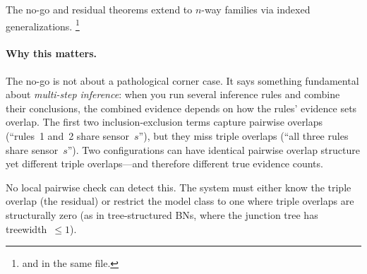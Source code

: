 \documentclass[11pt,openany]{report}
\begin{document}
\noindent
The no-go and residual theorems extend to $n$-way families via
indexed generalizations.%
\footnote{
and  in the same file.}

\paragraph{Why this matters.}
The no-go is not about a pathological corner case.  It says
something fundamental about \emph{multi-step inference}: when you
run several inference rules and combine their conclusions, the
combined evidence depends on how the rules' evidence sets overlap.
The first two inclusion-exclusion terms capture pairwise overlaps
(``rules~1 and~2 share sensor~$s$''), but they miss triple overlaps
(``all three rules share sensor~$s$'').  Two configurations can
have identical pairwise overlap structure yet different triple
overlaps---and therefore different true evidence counts.

No local pairwise check can detect this.  The system must either
know the triple overlap (the residual) or restrict the model class
to one where triple overlaps are structurally zero (as in
tree-structured BNs, where the junction tree has treewidth~$\le 1$).

\end{document}
